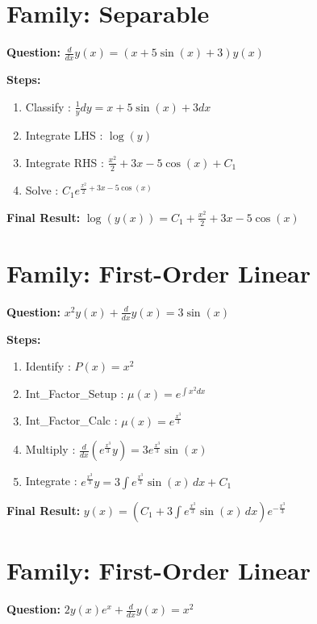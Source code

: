 \documentclass{article}
\begin{document}
\section*{Family: Separable}
\textbf{Question:} $\frac{d}{d x} y{\left(x \right)} = \left(x + 5 \sin{\left(x \right)} + 3\right) y{\left(x \right)}$

\textbf{Steps:}
\begin{enumerate}
\item Classify :  $\frac{1}{y} dy = x + 5 \sin{\left(x \right)} + 3 dx$
\item Integrate LHS :  $\log{\left(y \right)}$
\item Integrate RHS :  $\frac{x^{2}}{2} + 3 x - 5 \cos{\left(x \right)} + C_1$
\item Solve :  $C_{1} e^{\frac{x^{2}}{2} + 3 x - 5 \cos{\left(x \right)}}$
\end{enumerate}
\textbf{Final Result:} $\log{\left(y{\left(x \right)} \right)} = C_{1} + \frac{x^{2}}{2} + 3 x - 5 \cos{\left(x \right)}$

\section*{Family: First-Order Linear}
\textbf{Question:} $x^{2} y{\left(x \right)} + \frac{d}{d x} y{\left(x \right)} = 3 \sin{\left(x \right)}$

\textbf{Steps:}
\begin{enumerate}
\item Identify :  $P(x) = x^{2}$
\item Int_Factor_Setup :  $\mu(x) = e^{\int x^{2} dx}$
\item Int_Factor_Calc :  $\mu(x) = e^{\frac{x^{3}}{3}}$
\item Multiply :  $\frac{d}{dx}(e^{\frac{x^{3}}{3}}y) = 3 e^{\frac{x^{3}}{3}} \sin{\left(x \right)}$
\item Integrate :  $e^{\frac{x^{3}}{3}}y = 3 \int e^{\frac{x^{3}}{3}} \sin{\left(x \right)}\, dx + C_1$
\end{enumerate}
\textbf{Final Result:} $y{\left(x \right)} = \left(C_{1} + 3 \int e^{\frac{x^{3}}{3}} \sin{\left(x \right)}\, dx\right) e^{- \frac{x^{3}}{3}}$

\section*{Family: First-Order Linear}
\textbf{Question:} $2 y{\left(x \right)} e^{x} + \frac{d}{d x} y{\left(x \right)} = x^{2}$
\end{document}

